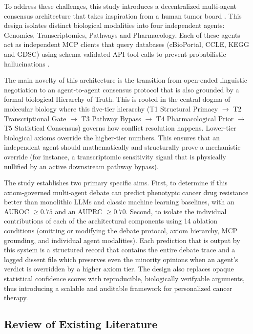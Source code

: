 \documentclass{article}
\begin{document}
To address these challenges, this study introduces a decentralized multi-agent consensus architecture that takes inspiration from a human tumor board \cite{zhang2025multiagent}. This design isolates distinct biological modalities into four independent agents: Genomics, Transcriptomics, Pathways and Pharmacology. Each of these agents act as independent MCP clients that query databases (cBioPortal, CCLE, KEGG and GDSC) using schema-validated API tool calls to prevent probabilistic hallucinations \cite{barretina2012cancer, iorio2016landscape}. 

The main novelty of this architecture is the transition from open-ended linguistic negotiation to an agent-to-agent consensus protocol that is also grounded by a formal biological Hierarchy of Truth. This is rooted in the central dogma of molecular biology where this five-tier hierarchy (T1 Structural Primacy $\rightarrow$ T2 Transcriptional Gate $\rightarrow$ T3 Pathway Bypass $\rightarrow$ T4 Pharmacological Prior $\rightarrow$ T5 Statistical Consensus) governs how conflict resolution happens. Lower-tier biological axioms override the higher-tier numbers. This ensures that an independent agent should mathematically and structurally prove a mechanistic override (for instance, a transcriptomic sensitivity siganl that is physically nullified by an active downstream pathway bypass).

The study establishes two primary specific aims. First, to determine if this axiom-governed multi-agent debate can predict phenotypic cancer drug resistance better than monolithic LLMs and classic machine learning baselines, with an AUROC $\geq 0.75$ and an AUPRC $\geq 0.70$. Second, to isolate the individual contributions of each of the architectural components using 14 ablation conditions (omitting or modifying the debate protocol, axiom hierarchy, MCP grounding, and individual agent modalities). Each prediction that is output by this system is a structured record that contains the entire debate trace and a logged dissent file which preserves even the minority opinions when an agent's verdict is overridden by a higher axiom tier. The design also replaces opaque statistical confidence scores with reproducible, biologically verifyable arguments, thus introducing a scalable and auditable framework for personalized cancer therapy. 

\subsection{Review of Existing Literature}
\label{sec:lit}
\end{document}
